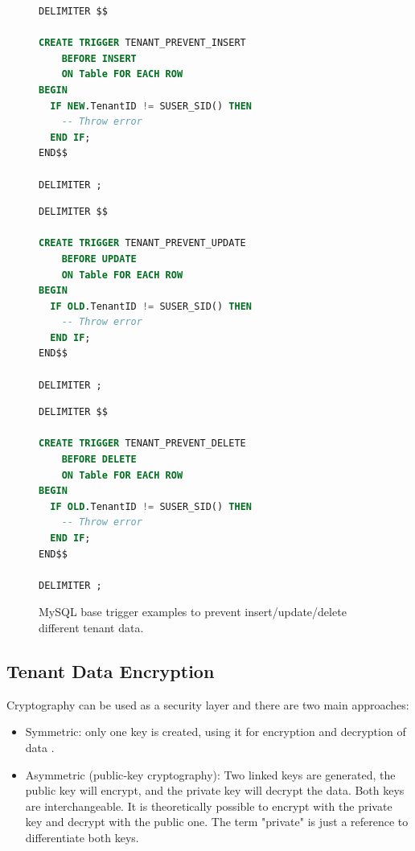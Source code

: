 \documentclass[12pt,english]{article} %
\begin{document}
\begin{figure}[h]
\centering
\begin{minipage}[t]{.31\textwidth}
\centering
\begin{lstlisting}[language=sql,numbers=none]
DELIMITER $$

CREATE TRIGGER TENANT_PREVENT_INSERT
    BEFORE INSERT
    ON Table FOR EACH ROW
BEGIN
  IF NEW.TenantID != SUSER_SID() THEN  
    -- Throw error
  END IF;
END$$    

DELIMITER ;
\end{lstlisting}
\end{minipage}%
\hspace{0.3cm}
\begin{minipage}[t]{.31\textwidth}
\centering
\begin{lstlisting}[language=sql,numbers=none]
DELIMITER $$

CREATE TRIGGER TENANT_PREVENT_UPDATE
    BEFORE UPDATE
    ON Table FOR EACH ROW
BEGIN
  IF OLD.TenantID != SUSER_SID() THEN  
    -- Throw error
  END IF;
END$$    

DELIMITER ;
\end{lstlisting}
\end{minipage}
\hspace{0.3cm}
\begin{minipage}[t]{.31\textwidth}
\centering
\begin{lstlisting}[language=sql,numbers=none]
DELIMITER $$

CREATE TRIGGER TENANT_PREVENT_DELETE
    BEFORE DELETE
    ON Table FOR EACH ROW
BEGIN
  IF OLD.TenantID != SUSER_SID() THEN  
    -- Throw error
  END IF;
END$$    

DELIMITER ;
\end{lstlisting}
\end{minipage}
\caption{MySQL base trigger examples to prevent insert/update/delete different tenant data.}
\label{fig:tenant-triggers-data-isolation}
\end{figure}


\subsection{Tenant Data Encryption}
Cryptography can be used as a security layer and there are two main approaches:
\begin{itemize}
    \item Symmetric: only one key is created, using it for encryption and decryption of data \cite{multi-tenant-data-architecture}.
    \item Asymmetric (public‐key cryptography): Two linked keys are generated, the public key will encrypt, and the private key will decrypt the data.
    Both keys are interchangeable.
    It is theoretically possible to encrypt with the private key and decrypt with the public one. The term "private" is just a reference to differentiate both keys.
\end{itemize}
\end{document}
